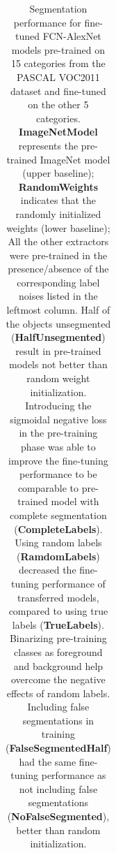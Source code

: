\begin{table}[t]
{\begin{tabular}{l|l|llll|l}
\end{tabular}
}
\caption{
Segmentation performance for fine-tuned FCN-AlexNet models pre-trained on 15 categories from the PASCAL VOC2011 dataset and fine-tuned on the other 5 categories.
\textbf{ImageNetModel} represents the pre-trained ImageNet model (upper baseline);
\textbf{RandomWeights} indicates that the randomly initialized weights (lower baseline);
All the other extractors were pre-trained in the presence/absence of the corresponding label noises listed in the leftmost column.
Half of the objects unsegmented (\textbf{HalfUnsegmented}) result in pre-trained models not better than random weight initialization.
Introducing the sigmoidal negative loss in the pre-training phase was able to improve the fine-tuning performance to be comparable to pre-trained model with complete segmentation (\textbf{CompleteLabels}).
Using random labels (\textbf{RamdomLabels}) decreased the fine-tuning performance of transferred models, compared to using true labels (\textbf{TrueLabels}).
Binarizing pre-training classes as foreground and background help overcome the negative effects of random labels.
Including false segmentations in training (\textbf{FalseSegmentedHalf}) had the same fine-tuning performance as not including false segmentations (\textbf{NoFalseSegmented}), better than random initialization.
}
\label{tab:robustness}
\end{table}


